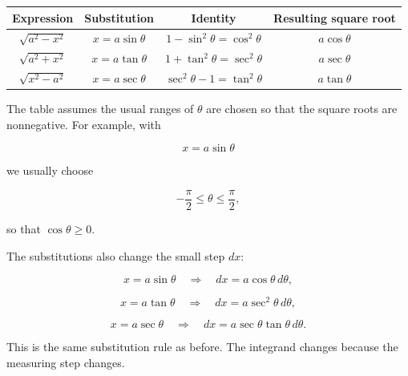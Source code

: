 \begin{center}
\begin{tabular}{c|c|c|c}
\textbf{Expression} & \textbf{Substitution} & \textbf{Identity} & \textbf{Resulting square root} \\ \hline
\(\sqrt{a^2-x^2}\) & \(x=a\sin\theta\) & \(1-\sin^2\theta=\cos^2\theta\) & \(a\cos\theta\) \\[4pt]
\(\sqrt{a^2+x^2}\) & \(x=a\tan\theta\) & \(1+\tan^2\theta=\sec^2\theta\) & \(a\sec\theta\) \\[4pt]
\(\sqrt{x^2-a^2}\) & \(x=a\sec\theta\) & \(\sec^2\theta-1=\tan^2\theta\) & \(a\tan\theta\)
\end{tabular}
\end{center}

The table assumes the usual ranges of \(\theta\) are chosen so that the square roots are
nonnegative.  For example, with

\[
x=a\sin\theta
\]

we usually choose

\[
-\frac{\pi}{2}\le \theta\le \frac{\pi}{2},
\]

so that \(\cos\theta\ge0\).

The substitutions also change the small step \(dx\):

\[
x=a\sin\theta
\quad\Longrightarrow\quad
dx=a\cos\theta\,d\theta,
\]

\[
x=a\tan\theta
\quad\Longrightarrow\quad
dx=a\sec^2\theta\,d\theta,
\]

\[
x=a\sec\theta
\quad\Longrightarrow\quad
dx=a\sec\theta\tan\theta\,d\theta.
\]

This is the same substitution rule as before.  The integrand changes because the
measuring step changes.


